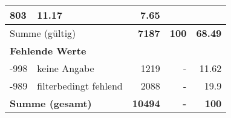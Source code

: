 \begin{longtable}{lXrrr}
       \num{803} &
       \num[round-mode=places,round-precision=2]{11.17} &
         \num[round-mode=places,round-precision=2]{7.65} \\
     \midrule
     \multicolumn{2}{l}{Summe (gültig)} &
       \textbf{\num{7187}} &
     \textbf{\num{100}} &
       \textbf{\num[round-mode=places,round-precision=2]{68.49}} \\
     \multicolumn{5}{l}{\textbf{Fehlende Werte}}\\
       -998 &
       keine Angabe &
         \num{1219} &
        - &
         \num[round-mode=places,round-precision=2]{11.62} \\
       -989 &
       filterbedingt fehlend &
         \num{2088} &
        - &
         \num[round-mode=places,round-precision=2]{19.9} \\
     \midrule
     \multicolumn{2}{l}{\textbf{Summe (gesamt)}} &
          \textbf{\num{10494}} &
        \textbf{-} &
        \textbf{\num{100}} \\
     \bottomrule
     \end{longtable}
     

